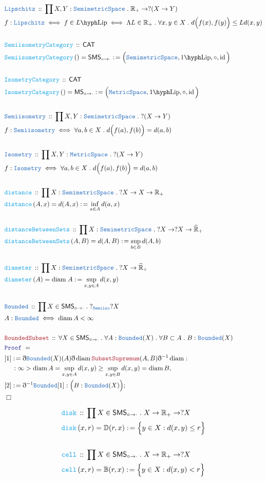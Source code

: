 \documentclass[12pt]{scrartcl}
\newcommand{\TYPE}[1]{\textcolor{NavyBlue}{\mathtt{#1}}}
\newcommand{\FUNC}[1]{\textcolor{Cerulean}{\mathtt{#1}}}
\newcommand{\LOGIC}[1]{\textcolor{Blue}{\mathtt{#1}}}
\newcommand{\THM}[1]{\textcolor{Maroon}{\mathtt{#1}}}
\renewcommand{\.}{\; . \;}
\newcommand{\de}{: \kern 0.1pc =}
\newcommand{\Act}[1]{\left( #1 \right)}
\newcommand{\Theorem}[2]{& \THM{#1} \, :: \, #2 \\ & \Proof = \\ }
\newcommand{\DeclareType}[2]{& \TYPE{#1} \, :: \, #2 \\}
\newcommand{\DefineType}[3]{& #1 : \TYPE{#2} \iff #3 \\}
\newcommand{\DefineNamedType}[4]{& #1 : \TYPE{#2} \iff #3 \iff #4 \\}
\newcommand{\DeclareFunc}[2]{& \FUNC{#1} \, :: \, #2 \\}
\newcommand{\DefineNamedFunc}[4]{&  \FUNC{#1}\Act{#2} = #3 \de #4 \\}
\newcommand{\NewLine}{\\ & \kern 1pc}
\newcommand{\Page}[1]{ \begin{align*} #1 \end{align*}   }
\newcommand{ \bd }{ \ByDef }
\newcommand{\Reals}{\mathbb{R} }
\DeclareMathOperator*{\id}{id}
\newcommand{\Say}[3]{& #1 \de #2 : #3, \\}
\newcommand{\Conclude}[3]{& #1 \de #2 : #3; \\}
\newcommand{\QED}{\; \square}
\newcommand{\EndProof}{& \QED \\}
\newcommand{\ByDef}{\eth}
\newcommand{\Proof}{\LOGIC{Proof} \; }
\newcommand{\CAT}{\mathsf{CAT}}
\DeclareMathOperator{\diam}{diam}
\newcommand{\Semiiso}{\mathsf{SMS}_{\circ \to \cdot}}
\begin{document}
\Page{
	\DeclareType{Lipschitz}{ \prod X,Y  : \TYPE{SemimetricSpace} \. \Reals_+ \to ?(X \to Y)   }
	\DefineNamedType{f}{Lipschitz}{f \in L\hyph\mathrm{Lip}}{\Lambda L \in \Reals_+ \. \forall x,y \in X \. d\Big( f(x), f(y)\Big) \le Ld(x,y)}
	\\
	\DeclareFunc{SemiisometryCategory}{\CAT}
	\DefineNamedFunc{SemiisometryCategory}{}{\mathsf{SMS}_{\circ \to \cdot}}{\Big(  \TYPE{SemimetricSpace}, 1\hyph\mathrm{Lip},\circ,\id\Big)}
	\\
	\DeclareFunc{IsometryCategory}{\CAT}
	\DefineNamedFunc{IsometryCategory}{}{\mathsf{MS}_{\circ \to \cdot}}{\Big(  \TYPE{MetricSpace}, 1\hyph\mathrm{Lip},\circ,\id\Big)}
	\\
	\DeclareType{Semiisometry}{\prod X,Y : \TYPE{SemimetricSpace} \. ?(X \to Y)}
	\DefineType{f}{Semiisometry}{\forall a,b \in X \. d\Big( f(a),f(b)\Big) = d(a,b)}
	\\
	\DeclareType{Isometry}{\prod X,Y : \TYPE{MetricSpace} \. ?(X \to Y)}
	\DefineType{f}{Isometry}{\forall a,b \in X \. d\Big( f(a),f(b)\Big) = d(a,b)}
	\\
	\DeclareFunc{distance}{\prod X : \TYPE{SemimetricSpace} \. ?X \to X \to \Reals_+}
	\DefineNamedFunc{distance}{A,x}{d(A,x)}{\inf_{a \in A} d(a,x)}
	\\
	\DeclareFunc{distanceBetweenSets}{\prod X : \TYPE{SemimetricSpace} \. ?X \to ?X \to \widehat{\Reals}_+}
	\DefineNamedFunc{distanceBetweenSets}{A,B}{d(A,B)}{\sup_{b \in B} d(A,b)}
	\\
	\DeclareFunc{diameter}{\prod X : \TYPE{SemimetricSpace} \. ?X \to \widehat{\Reals}_+}
	\DefineNamedFunc{diameter}{A}{\mathrm{diam}\; A}{\sup_{x,y \in A} d(x,y)}
	\\
	\DeclareType{Bounded}{\prod X \in \Semiiso \. ?_{\TYPE{Semiiso}}? X}
	\DefineType{A}{Bounded}{\diam A < \infty}
	\\
	\Theorem{BoundedSubset}{\forall X \in \Semiiso \. \forall A : \TYPE{Bounded}(X) \. \forall B \subset A \. B : \TYPE{Bounded}(X) }
	\Say{[1]}{\bd \TYPE{Bounded}(X)(A)\bd \diam \THM{SubsetSupremum}(A,B)\bd^{-1}\diam}
	{ \NewLine :  \infty > \diam A = \sup_{x,y \in A} d(x,y) \ge \sup_{x,y \in B} d(x,y) = \diam B  }
	\Conclude{[2]}{\bd^{-1}\TYPE{Bounded}[1]}{\Big( B : \TYPE{Bounded}(X) \Big)}
	\EndProof
}\Page{
	\DeclareFunc{disk}{\prod X \in \Semiiso \. X \to \Reals_+  \to ?X }
	\DefineNamedFunc{disk}{x,r}{\mathbb{D}(r,x)}{\Big\{   y \in X : d(x,y) \le r  \Big\}}
	\\
	\DeclareFunc{cell}{\prod X \in \Semiiso \. X \to \Reals_+  \to ?X }
	\DefineNamedFunc{cell}{x,r}{\mathbb{B}(r,x)}{\Big\{   y \in X : d(x,y) <  r  \Big\}}
}
\end{document}
